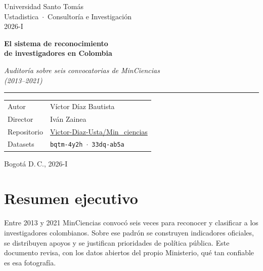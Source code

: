 \documentclass[11pt,a4paper,oneside]{article}
\title{}
\author{}
\date{}
\newcommand{\autorInforme}{Víctor Díaz Bautista}
\newcommand{\directorInforme}{Iván Zainea}
\newcommand{\universidad}{Universidad Santo Tomás}
\newcommand{\unidad}{Ustadistica \,$\cdot$\, Consultoría e Investigación}
\newcommand{\periodo}{2026-I}
\newcommand{\repoUrl}{https://github.com/Victor-Diaz-Usta/Min\_ciencias}
\begin{document}

\begin{titlepage}
\thispagestyle{empty}
\centering
\vspace*{1.4cm}
{\footnotesize\sffamily\color{rule}\universidad\\\unidad\\\periodo}\par
\vspace{2.2cm}
{\Huge\bfseries\color{usta} El sistema de reconocimiento\\[2pt] de investigadores en Colombia}\par
\vspace{0.8cm}
{\Large\itshape Auditoría sobre seis convocatorias de MinCiencias\\(2013--2021)}\par
\vspace{2.4cm}

{\color{accent}\rule{0.4\linewidth}{0.6pt}}

\vspace{0.8cm}
\begin{tabularx}{0.7\linewidth}{>{\raggedright\arraybackslash}X >{\raggedleft\arraybackslash}X}
\sffamily\color{rule}\footnotesize Autor & \autorInforme \\[3pt]
\sffamily\color{rule}\footnotesize Director & \directorInforme \\[3pt]
\sffamily\color{rule}\footnotesize Repositorio & \href{\repoUrl}{Victor-Diaz-Usta/Min\_ciencias} \\[3pt]
\sffamily\color{rule}\footnotesize Datasets & \texttt{bqtm-4y2h} \,$\cdot$\, \texttt{33dq-ab5a}
\end{tabularx}

\vfill
{\footnotesize\color{rule}Bogotá D.\,C., \periodo}
\end{titlepage}

\section*{Resumen ejecutivo}

Entre 2013 y 2021 MinCiencias convocó seis veces para reconocer y clasificar a los investigadores colombianos. Sobre ese padrón se construyen indicadores oficiales, se distribuyen apoyos y se justifican prioridades de política pública. Este documento revisa, con los datos abiertos del propio Ministerio, qué tan confiable es esa fotografía.
\end{document}
